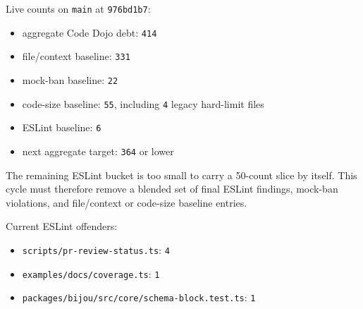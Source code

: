 Live counts on \texttt{m\allowbreak{}a\allowbreak{}i\allowbreak{}n} at \texttt{9\allowbreak{}7\allowbreak{}6\allowbreak{}b\allowbreak{}d\allowbreak{}1\allowbreak{}b\allowbreak{}7}:

\begin{itemize}
\tightlist
\item
  aggregate Code Dojo debt: \texttt{4\allowbreak{}1\allowbreak{}4}
\item
  file/context baseline: \texttt{3\allowbreak{}3\allowbreak{}1}
\item
  mock-ban baseline: \texttt{2\allowbreak{}2}
\item
  code-size baseline: \texttt{5\allowbreak{}5}, including \texttt{4} legacy hard-limit files
\item
  ESLint baseline: \texttt{6}
\item
  next aggregate target: \texttt{3\allowbreak{}6\allowbreak{}4} or lower
\end{itemize}

The remaining ESLint bucket is too small to carry a 50-count slice by itself. This cycle must therefore remove a blended set of final ESLint findings, mock-ban violations, and file/context or code-size baseline entries.

Current ESLint offenders:

\begin{itemize}
\tightlist
\item
  \texttt{s\allowbreak{}c\allowbreak{}r\allowbreak{}i\allowbreak{}p\allowbreak{}t\allowbreak{}s\allowbreak{}/\allowbreak{}p\allowbreak{}r\allowbreak{}-\allowbreak{}r\allowbreak{}e\allowbreak{}v\allowbreak{}i\allowbreak{}e\allowbreak{}w\allowbreak{}-\allowbreak{}s\allowbreak{}t\allowbreak{}a\allowbreak{}t\allowbreak{}u\allowbreak{}s\allowbreak{}.\allowbreak{}t\allowbreak{}s}: \texttt{4}
\item
  \texttt{e\allowbreak{}x\allowbreak{}a\allowbreak{}m\allowbreak{}p\allowbreak{}l\allowbreak{}e\allowbreak{}s\allowbreak{}/\allowbreak{}d\allowbreak{}o\allowbreak{}c\allowbreak{}s\allowbreak{}/\allowbreak{}c\allowbreak{}o\allowbreak{}v\allowbreak{}e\allowbreak{}r\allowbreak{}a\allowbreak{}g\allowbreak{}e\allowbreak{}.\allowbreak{}t\allowbreak{}s}: \texttt{1}
\item
  \texttt{p\allowbreak{}a\allowbreak{}c\allowbreak{}k\allowbreak{}a\allowbreak{}g\allowbreak{}e\allowbreak{}s\allowbreak{}/\allowbreak{}b\allowbreak{}i\allowbreak{}j\allowbreak{}o\allowbreak{}u\allowbreak{}/\allowbreak{}s\allowbreak{}r\allowbreak{}c\allowbreak{}/\allowbreak{}c\allowbreak{}o\allowbreak{}r\allowbreak{}e\allowbreak{}/\allowbreak{}s\allowbreak{}c\allowbreak{}h\allowbreak{}e\allowbreak{}m\allowbreak{}a\allowbreak{}-\allowbreak{}b\allowbreak{}l\allowbreak{}o\allowbreak{}c\allowbreak{}k\allowbreak{}.\allowbreak{}t\allowbreak{}e\allowbreak{}s\allowbreak{}t\allowbreak{}.\allowbreak{}t\allowbreak{}s}: \texttt{1}
\end{itemize}

